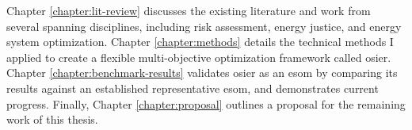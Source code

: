 Chapter \ref{chapter:lit-review} discusses the existing literature and work from
several spanning disciplines, including risk assessment, energy justice, and
energy system optimization. Chapter \ref{chapter:methods} details the technical
methods I applied to create a flexible multi-objective optimization framework
called \ac{osier}. Chapter \ref{chapter:benchmark-results} validates \ac{osier}
as an \ac{esom} by comparing its results against an established representative
\ac{esom}, and demonstrates current progress. Finally, Chapter
\ref{chapter:proposal} outlines a proposal for the remaining work of this
thesis.

